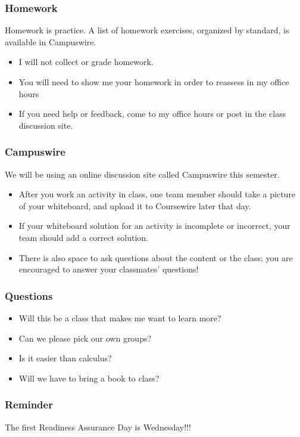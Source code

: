 \documentclass[aspectration=1610]{beamer}
\begin{document}
\begin{frame}\frametitle{Homework}
Homework is practice.  A list of homework exercises, organized by standard, is available in Campuswire.
\begin{itemize}
\item I will not collect or grade homework.
\item You will need to show me your homework in order to reassess in my office hours
\item If you need help or feedback, come to my office hours or post in the class discussion site.
\end{itemize}
\end{frame}

\begin{frame}\frametitle{Campuswire}
We will be using an online discussion site called Campuswire this semester.
\begin{itemize}
\item After you work an activity in class, one team member should take a picture of your whiteboard, and upload it to Coursewire later that day.
\item If your whiteboard solution for an activity is incomplete or incorrect, your team should add a correct solution.
\item There is also space to ask questions about the content or the class; you are encouraged to answer your classmates' questions!
\end{itemize}

\end{frame}

\begin{frame}\frametitle{Questions}

\begin{itemize}
\item Will this be a class that makes me want to learn more? 
\item Can we please pick our own groups?
\item Is it easier than calculus?
\item Will we have to bring a book to class?
\end{itemize}
\end{frame}


\begin{frame}\frametitle{Reminder}
The first Readiness Assurance Day is Wednesday!!!
\end{frame}
\end{document}
